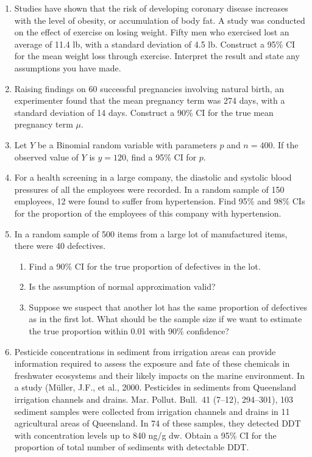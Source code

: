 \begin{enumerate}
    \item[\textbf{5.5.7.}] Studies have shown that the risk of developing coronary disease increases with the level of obesity, or accumulation of body fat. A study was conducted on the effect of exercise on losing weight. Fifty men who exercised lost an average of 11.4 lb, with a standard deviation of 4.5 lb. Construct a 95\% CI for the mean weight loss through exercise. Interpret the result and state any assumptions you have made.
    \item[\textbf{5.5.8.}] Raising findings on 60 successful pregnancies involving natural birth, an experimenter found that the mean pregnancy term was 274 days, with a standard deviation of 14 days. Construct a 90\% CI for the true mean pregnancy term $\mu$.
    \item[\textbf{5.5.9.}] Let $Y$ be a Binomial random variable with parameters $p$ and $n=400$. If the observed value of $Y$ is $y=120$, find a 95\% CI for $p$.
    \item[\textbf{5.5.10.}] For a health screening in a large company, the diastolic and systolic blood pressures of all the employees were recorded. In a random sample of 150 employees, 12 were found to suffer from hypertension. Find 95\% and 98\% CIs for the proportion of the employees of this company with hypertension.
    \item[\textbf{5.5.11.}] In a random sample of 500 items from a large lot of manufactured items, there were 40 defectives.
    \begin{enumerate}
        \item[\textbf{(a)}] Find a 90\% CI for the true proportion of defectives in the lot.
        \item[\textbf{(b)}] Is the assumption of normal approximation valid?
        \item[\textbf{(c)}] Suppose we suspect that another lot has the same proportion of defectives as in the first lot. What should be the sample size if we want to estimate the true proportion within 0.01 with 90\% confidence?
    \end{enumerate}
    \item[\textbf{5.5.12.}] Pesticide concentrations in sediment from irrigation areas can provide information required to assess the exposure and fate of these chemicals in freshwater ecosystems and their likely impacts on the marine environment. In a study (M\"{u}ller, J.F., et al., 2000. Pesticides in sediments from Queensland irrigation channels and drains. Mar. Pollut. Bull.\ 41 (7--12), 294--301), 103 sediment samples were collected from irrigation channels and drains in 11 agricultural areas of Queensland. In 74 of these samples, they detected DDT with concentration levels up to 840 ng/g dw. Obtain a 95\% CI for the proportion of total number of sediments with detectable DDT.

\end{enumerate}
